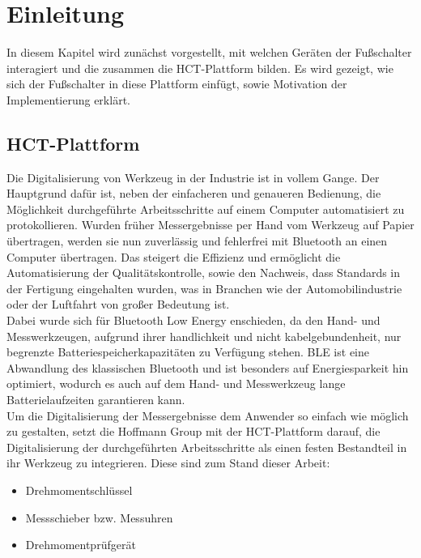 \section{Einleitung}

In diesem Kapitel wird zunächst vorgestellt, mit welchen Geräten der Fußschalter interagiert und die zusammen die HCT-Plattform bilden. Es wird gezeigt, wie sich der Fußschalter in diese Plattform einfügt, sowie Motivation der Implementierung erklärt.

\subsection{HCT-Plattform}
Die Digitalisierung von Werkzeug in der Industrie ist in vollem Gange. Der Hauptgrund dafür ist, neben der einfacheren und genaueren Bedienung, die Möglichkeit durchgeführte Arbeitsschritte auf einem Computer automatisiert zu protokollieren. Wurden früher Messergebnisse per Hand vom Werkzeug auf Papier übertragen, werden sie nun zuverlässig und fehlerfrei mit Bluetooth an einen Computer übertragen. Das steigert die Effizienz und ermöglicht die Automatisierung der Qualitätskontrolle, sowie den Nachweis, dass Standards in der Fertigung eingehalten wurden, was in Branchen wie der Automobilindustrie oder der Luftfahrt von großer Bedeutung ist. \\
Dabei wurde sich für Bluetooth Low Energy enschieden, da den Hand- und Messwerkzeugen, aufgrund ihrer handlichkeit und nicht kabelgebundenheit, nur begrenzte Batteriespeicherkapazitäten zu Verfügung stehen. BLE ist eine Abwandlung des klassischen Bluetooth und ist besonders auf Energiesparkeit hin optimiert, wodurch es auch auf dem Hand- und Messwerkzeug lange Batterielaufzeiten garantieren kann.\\
Um die Digitalisierung der Messergebnisse dem Anwender so einfach wie möglich zu gestalten, setzt die Hoffmann Group mit der HCT-Plattform darauf, die Digitalisierung der durchgeführten Arbeitsschritte als einen festen Bestandteil in ihr Werkzeug zu integrieren. Diese sind zum Stand dieser Arbeit: 
\begin{itemize}
	\item Drehmomentschlüssel
	\item Messschieber bzw. Messuhren
	\item Drehmomentprüfgerät
\end{itemize}
